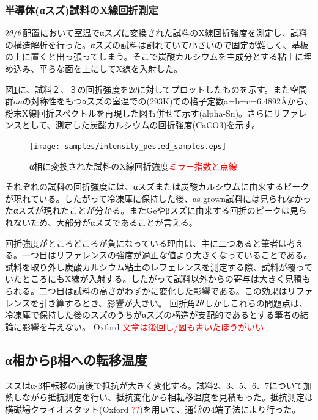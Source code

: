 \subsubsection{半導体(αスズ)試料のX線回折測定}
$\rm 2\theta/\theta$配置において室温でαスズに変換された試料のX線回折強度を測定し、試料の構造解析を行った。αスズの試料は割れていて小さいので固定が難しく、基板の上に置くと出っ張ってしまう。そこで炭酸カルシウムを主成分とする粘土に埋め込み、平らな面を上にしてX線を入射した。

図\ref{fig:intensity_pested_samples}に、試料２、３の回折強度を$2\theta$に対してプロットしたものを示す。また空間群$aa$の対称性をもつαスズの室温での(293K)での格子定数a=b=c=6.4892\AA \cite{THEWLIS}から、粉末X線回折スペクトルを再現した図も併せて示す(alpha-Sn)。さらにリファレンスとして、測定した炭酸カルシウムの回折強度(CaCO3)を示す。
\begin{figure}[!h]
  \begin{center}
  \texttt{[image: samples/intensity\_pested\_samples.eps]}
  \end{center}
  \caption{α相に変換された試料のX線回折強度\textcolor{red}{ミラー指数と点線}}
  \label{fig:intensity_pested_samples}
\end{figure}

それぞれの試料の回折強度には、αスズまたは炭酸カルシウムに由来するピークが現れている。したがって冷凍庫に保持した後、as grown試料には見られなかったαスズが現れたことが分かる。またGeやβスズに由来する回折のピークは見られないため、大部分がαスズであることが言える。

回折強度がところどころが負になっている理由は、主に二つあると筆者は考える。一つ目はリファレンスの強度が適正な値より大きくなっていることである。試料を取り外し炭酸カルシウム粘土のレフェレンスを測定する際、試料が覆っていたところにもX線が入射する。したがって試料以外からの寄与は大きく見積もられる。二つ目は試料の高さがわずかに変化した影響である。この効果はリファレンスを引き算するとき、影響が大きい。
回折角$\rm 2\theta$しかしこれらの問題点は、冷凍庫で保持した後のスズのうちがαスズの構造が支配的であるとする筆者の結論に影響を与えない。
Oxford \textcolor{red}{文章は後回し/図も書いたほうがいい}


\subsection{α相からβ相への転移温度}
スズはα-β相転移の前後で抵抗が大きく変化する。試料2、3、5、6、7について加熱しながら抵抗測定を行い、抵抗変化から相転移温度を見積もった。抵抗測定は横磁場クライオスタット(Oxford \textcolor{red}{??})を用いて、通常の4端子法により行った。

